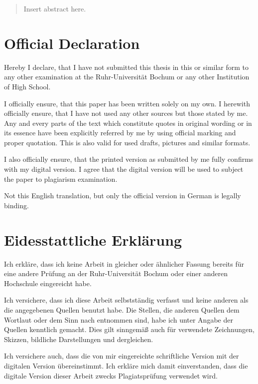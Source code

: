 \begin{abstract}

Insert abstract here.
\end{abstract}

\cleardoublepage

\pagestyle{scrplain} %
\section*{Official Declaration}
Hereby I declare, that I have not submitted this thesis in this or similar form to any other examination at the Ruhr-Universität Bochum or any other Institution of High School.

\noindent
I officially ensure, that this paper has been written solely on my own.
I herewith officially ensure, that I have not used any other sources but those stated by me.
Any and every parts of the text which constitute quotes in original wording or in its essence have been explicitly referred by me by using official marking and proper quotation.
This is also valid for used drafts, pictures and similar formats.

\noindent
I also officially ensure, that the printed version as submitted by me fully confirms with my digital version.
I agree that the digital version will be used to subject the paper to plagiarism examination.

\noindent
Not this English translation, but only the official version in German is legally binding\@.

\section*{Eidesstattliche Erklärung}
{
Ich erkläre, dass ich keine Arbeit in gleicher oder ähnlicher Fassung bereits für eine andere Prüfung an der Ruhr-Universität Bochum oder einer anderen Hochschule eingereicht habe.

\noindent
Ich versichere, dass ich diese Arbeit selbstständig verfasst und keine anderen als die angegebenen Quellen benutzt habe. Die Stellen, die anderen Quellen dem Wortlaut oder dem Sinn nach entnommen sind, habe ich unter Angabe der Quellen kenntlich gemacht.
Dies gilt sinngemäß auch für verwendete Zeichnungen, Skizzen, bildliche Darstellungen und dergleichen.

\noindent
Ich versichere auch, dass die von mir eingereichte schriftliche Version mit der digitalen Version übereinstimmt.
Ich erkläre mich damit einverstanden, dass die digitale Version dieser Arbeit zwecks Plagiatsprüfung verwendet wird.\@}

